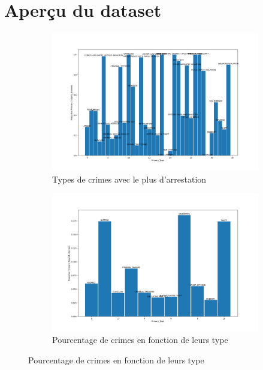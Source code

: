 \documentclass{article}
\begin{document}
    \section{Aperçu du dataset}
    \begin{figure}[H]
	    \centering
	    \begin{subfigure}{.45\textwidth}
		    \includegraphics[scale=.2]{Images/typeArrestation.png}
		    \caption{Types de crimes avec le plus d'arrestation}
	    \end{subfigure}
	    \begin{subfigure}{.45\textwidth}
		    \includegraphics[scale=.2]{Images/pprimarytype.png}
		    \caption{Pourcentage de crimes en fonction de leurs type}
	    \end{subfigure}

\end{figure}
\end{document}

